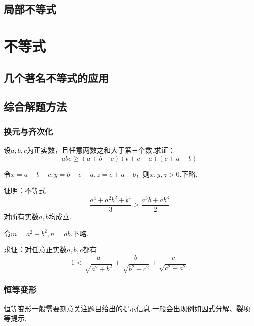 \documentclass[cn,hazy,black,10pt,normal]{elegantnote}
\begin{document}
\section{局部不等式}

\chapter{不等式}

\section{几个著名不等式的应用}

\section{综合解题方法}

\subsection{换元与齐次化}

\begin{problem} %
	设$a,b,c$为正实数，且任意两数之和大于第三个数.求证：$$abc \geq (a+b-c)(b+c-a)(c+a-b)$$
\end{problem}
\begin{solution}
	令$x=a+b-c,y=b+c-a,z=c+a-b$，则$x,y,z>0$.下略.
\end{solution}

\begin{problem} %
	证明：不等式$$\frac{a^4+a^2b^2+b^4}{3} \geq \frac{a^3b+ab^3}{2}$$
	对所有实数$a,b$均成立.
\end{problem}
\begin{solution}
	令$m=a^2+b^2,n=ab$.下略.
\end{solution}

\begin{problem} %
	求证：对任意正实数$a,b,c$都有$$1 < \frac{a}{\sqrt{a^2+b^2}} + \frac{b}{\sqrt{b^2+c^2}} + \frac{c}{\sqrt{c^2+a^2}}$$
\end{problem}
\begin{solution}
\end{solution}

\subsection{恒等变形}

恒等变形一般需要刻意关注题目给出的提示信息.一般会出现例如因式分解、裂项等提示.
\end{document}
